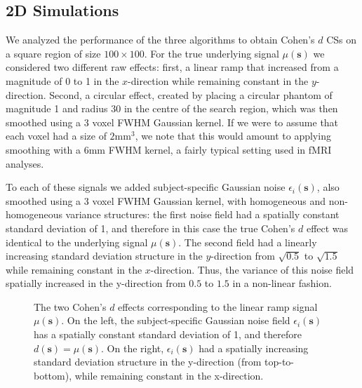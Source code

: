 \subsection{2D Simulations}
\label{sec:cohen_2D_simulations}
We analyzed the performance of the three algorithms to obtain Cohen's $d$ CSs on a square region of size $100 \times 100$. For the true underlying signal $\mu(\bm{s})$ we considered two different raw effects: first, a linear ramp that increased from a magnitude of 0 to 1 in the $x$-direction while remaining constant in the $y$-direction. Second, a circular effect, created by placing a circular phantom of magnitude 1 and radius 30 in the centre of the search region, which was then smoothed using a 3 voxel FWHM Gaussian kernel. If we were to assume that each voxel had a size of $2$mm$^{3}$, we note that this would amount to applying smoothing with a $6$mm FWHM kernel, a fairly typical setting used in fMRI analyses.

To each of these signals we added subject-specific Gaussian noise $\epsilon_{i}(\bm{s})$, also smoothed using a 3 voxel FWHM Gaussian kernel, with homogeneous and non-homogeneous variance structures: the first noise field had a spatially constant standard deviation of 1, and therefore in this case the true Cohen's $d$ effect was identical to the underlying signal $\mu(\bm{s})$. The second field had a linearly increasing standard deviation structure in the $y$-direction from $\sqrt{0.5}$ to $\sqrt{1.5}$ while remaining constant in the $x$-direction. Thus, the variance of this noise field spatially increased in the y-direction from $0.5$ to $1.5$ in a non-linear fashion. 

\begin{figure}[htbp]
  \centering
  \hspace{1em}
  \caption{The two Cohen's $d$ effects corresponding to the linear ramp signal $\mu(\bm{s})$. On the left, the subject-specific Gaussian noise field $\epsilon_{i}(\bm{s})$ has a spatially constant standard deviation of 1, and therefore $d(\bm{s}) = \mu(\bm{s})$. On the right, $\epsilon_{i}(\bm{s})$ had a spatially increasing standard deviation structure in the y-direction (from top-to-bottom), while remaining constant in the x-direction.} 
\label{fig:linear_ramp_figures}
\end{figure}

